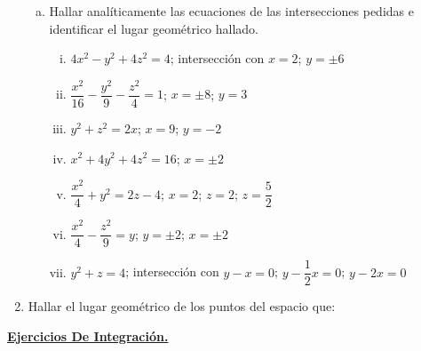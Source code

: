 \documentclass[11pt]{article}
\begin{document}
\begin{enumerate}[\hspace{-5mm}$1)$]
\begin{enumerate}[a)]
    \item Hallar analíticamente las ecuaciones de las intersecciones pedidas e identificar el lugar geométrico hallado.
\begin{enumerate}[i)]
\item $4x^2 - y^2 + 4z^2 = 4$; intersección con $x = 2$; $y = \pm 6$
\item $\dfrac{x^2}{16} - \dfrac{y^2}{9} - \dfrac{z^2}{4} = 1$; $x = \pm 8$; $y = 3$
\item $y^2 + z^2 = 2x$; $x = 9$; $y = -2$
\item $x^2 + 4y^2 + 4z^2 = 16$; $x = \pm 2$
\item $\dfrac{x^2}{4} + y^2 = 2z - 4$; $x = 2$; $z = 2$; $z = \dfrac{5}{2}$
\item $\dfrac{x^2}{4} - \dfrac{z^2}{9} = y$; $y = \pm 2$; $x = \pm 2$
\item $y^2 + z = 4$; intersección con $y - x = 0$; $y - \dfrac{1}{2}x = 0$; $y - 2x = 0$
\end{enumerate}

\end{enumerate}







\item Hallar el lugar geométrico de los puntos del espacio que:

\end{enumerate} 



\underline{\bf \large{Ejercicios De Integración. }}
\end{document}
